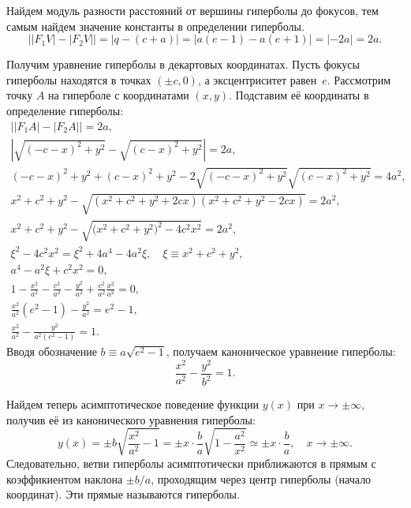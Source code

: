 Найдем модуль разности расстояний от вершины гиперболы до фокусов, тем самым найдем значение константы в определении гиперболы. 
\begin{equation*}
    \big||F_1 V| - |F_2 V|\big| = |q - (c + a)| = |a(e - 1) - a(e + 1)| = |-2a| = 2a.
\end{equation*}

Получим уравнение гиперболы в декартовых координатах. Пусть фокусы гиперболы находятся в точках $(\pm c, 0)$, а эксцентриситет равен~$e$. Рассмотрим точку $A$ на гиперболе с координатами $(x,y)$. Подставим её координаты в определение гиперболы:
\begin{gather*}
    \big| |F_1 A| - |F_2 A| \big| = 2a,\\
    \left|\sqrt{(-c - x)^2 + y^2} - \sqrt{(c - x)^2 + y^2} \right| = 2a,\\
    (-c - x)^2 + y^2 + (c - x)^2 + y^2 - 2\sqrt{(-c - x)^2 + y^2}\sqrt{(c - x)^2 + y^2} = 4a^2,\\
    x^2 + c^2 + y^2  - \sqrt{(x^2 + c^2 + y^2 + 2cx ) ( x^2 + c^2 + y^2 - 2cx )} = 2a^2,\\
    x^2 + c^2 + y^2 - \sqrt{\big(x^2 + c^2 + y^2\big)^2 - 4 c^2 x^2} = 2a^2,\\
    \xi^2 - 4 c^2 x^2 = \xi^2 + 4a^4 - 4a^2\xi, \quad \xi \equiv x^2 + c^2 + y^2,\\
    a^4 - a^2 \xi + c^2x^2 = 0,\\
    1 - \frac{x^2}{a^2} - \frac{c^2}{a^2} - \frac{y^2}{a^2} + \frac{c^2}{a^2} \frac{x^2}{a^2} = 0,\\
    \frac{x^2}{a^2} (e^2 - 1) - \frac{y^2}{a^2} = e^2 - 1,\\
    \frac{x^2}{a^2} - \frac{y^2}{a^2(e^2 - 1)} = 1.
\end{gather*}
Вводя обозначение $b \equiv a \sqrt{e^2 - 1}$, получаем каноническое уравнение гиперболы:
\begin{equation}
    \frac{x^2}{a^2}-\frac{y^2}{b^2}=1.
\end{equation}

Найдем теперь асимптотическое поведение функции $y(x)$ при $x \rightarrow \pm \infty$, получив её из канонического уравнения гиперболы:
\begin{equation*}
     y(x) = \pm b\sqrt{\frac{x^2}{a^2} - 1} =  \pm x \cdot \frac{b}{a}\sqrt{1 - \frac{a^2}{x^2}} \simeq \pm x \cdot \frac{b}{a}, \quad x \rightarrow \pm \infty.
\end{equation*}
Следовательно, ветви гиперболы асимптотически приближаются в прямым с коэффикиентом наклона $\pm b/a$, проходящим через центр гиперболы (начало координат). Эти прямые называются  гиперболы.

